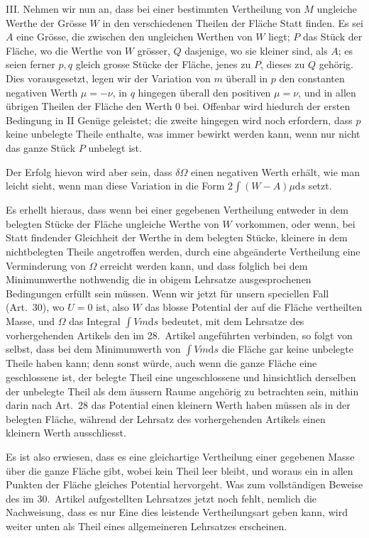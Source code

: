 III. Nehmen wir nun an, dass bei einer bestimmten Vertheilung von $M$ ungleiche Werthe der Grösse $W$ in den verschiedenen Theilen der Fläche Statt finden. Es sei $A$ eine Grösse, die zwischen den ungleichen Werthen von $W$ liegt; $P$ das Stück der Fläche, wo die Werthe von $W$ grösser, $Q$ dasjenige, wo sie kleiner sind, als $A$; es seien ferner $p,q$ gleich grosse Stücke der Fläche, jenes zu $P$, dieses zu $Q$ gehörig. Dies vorausgesetzt, legen wir der Variation
von $m$ überall in $p$ den constanten negativen Werth $\mu=-\nu$, in $q$ hingegen überall den positiven $\mu=\nu$, und in allen übrigen Theilen der Fläche den Werth $0$ bei. Offenbar wird hiedurch der ersten Bedingung in II Genüge geleistet; die zweite hingegen wird noch erfordern, dass $p$ keine unbelegte Theile enthalte, was immer bewirkt werden kann, wenn nur nicht das ganze Stück $P$ unbelegt ist.

Der Erfolg hievon wird aber sein, dass $\delta\Omega$ einen negativen Werth erhält, wie man leicht sieht, wenn man diese Variation in die Form $2\int(W-A)\mu\mathrm ds$ setzt.

Es erhellt hieraus, dass wenn bei einer gegebenen Vertheilung entweder in dem belegten Stücke der Fläche ungleiche Werthe von $W$ vorkommen, oder wenn, bei Statt findender Gleichheit der Werthe in dem belegten Stücke, kleinere in dem nichtbelegten Theile angetroffen werden, durch eine abgeänderte Vertheilung eine Verminderung von $\Omega$ erreicht werden kann, und dass folglich bei dem Minimumwerthe nothwendig die in obigem Lehrsatze ausgesprochenen Bedingungen erfüllt sein müssen.
Wenn wir jetzt für unsern speciellen Fall (Art.\ 30), wo $U=0$ ist, also $W$ das blosse Potential der auf die Fläche vertheilten Masse, und $\Omega$ das Integral $\int Vm\mathrm ds$ bedeutet, mit dem Lehrsatze des vorhergehenden Artikels den im 28.\ Artikel angeführten verbinden, so folgt von selbst, dass bei dem Minimumwerth von $\int Vm\mathrm ds$ die Fläche gar keine unbelegte Theile haben kann; denn sonst würde, auch wenn die ganze Fläche eine geschlossene ist, der belegte Theil eine ungeschlossene und hinsichtlich derselben der unbelegte Theil als dem äussern Raume angehörig zu betrachten sein, mithin darin nach Art.\ 28 das Potential einen kleinern Werth haben müssen als in der belegten Fläche, während der Lehrsatz des vorhergehenden Artikels einen kleinern Werth ausschliesst.

Es ist also erwiesen, dass es eine gleichartige Vertheilung einer gegebenen Masse über die ganze Fläche gibt, wobei kein Theil leer bleibt, und woraus ein in allen Punkten der Fläche gleiches Potential hervorgeht. Was zum vollständigen Beweise des im 30.\ Artikel aufgestellten Lehrsatzes jetzt noch fehlt, nemlich die Nachweisung, dass es nur Eine dies leistende Vertheilungsart geben kann, wird weiter unten als Theil eines allgemeineren Lehrsatzes erscheinen.

